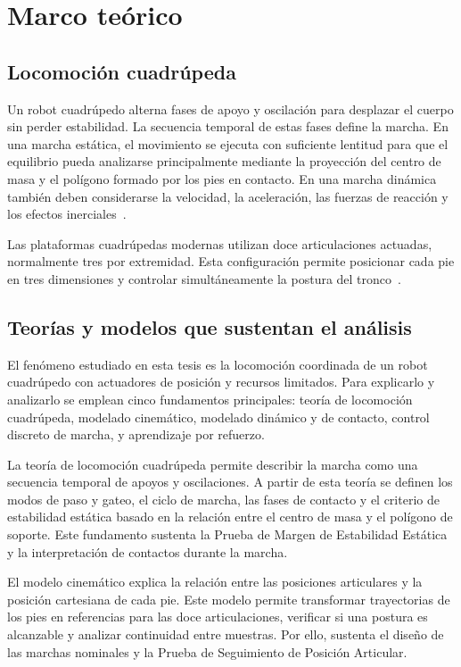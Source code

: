 \chapter{Marco teórico}

\section{Locomoción cuadrúpeda}

Un robot cuadrúpedo alterna fases de apoyo y oscilación para desplazar el cuerpo sin perder estabilidad. La secuencia temporal de estas fases define la marcha. En una marcha estática, el movimiento se ejecuta con suficiente lentitud para que el equilibrio pueda analizarse principalmente mediante la proyección del centro de masa y el polígono formado por los pies en contacto. En una marcha dinámica también deben considerarse la velocidad, la aceleración, las fuerzas de reacción y los efectos inerciales~\cite{zamani2011dynamics}.

Las plataformas cuadrúpedas modernas utilizan doce articulaciones actuadas, normalmente tres por extremidad. Esta configuración permite posicionar cada pie en tres dimensiones y controlar simultáneamente la postura del tronco~\cite{bledt2018cheetah3,hutter2016anymal}.

\section{Teorías y modelos que sustentan el análisis}

El fenómeno estudiado en esta tesis es la locomoción coordinada de un robot
cuadrúpedo con actuadores de posición y recursos limitados. Para explicarlo y
analizarlo se emplean cinco fundamentos principales: teoría de locomoción
cuadrúpeda, modelado cinemático, modelado dinámico y de contacto, control
discreto de marcha, y aprendizaje por refuerzo.

La teoría de locomoción cuadrúpeda permite describir la marcha como una
secuencia temporal de apoyos y oscilaciones. A partir de esta teoría se definen
los modos de paso y gateo, el ciclo de marcha, las fases de contacto y el
criterio de estabilidad estática basado en la relación entre el centro de masa y
el polígono de soporte. Este fundamento sustenta la Prueba de Margen de
Estabilidad Estática y la interpretación de contactos durante la marcha.

El modelo cinemático explica la relación entre las posiciones articulares y la
posición cartesiana de cada pie. Este modelo permite transformar trayectorias de
los pies en referencias para las doce articulaciones, verificar si una postura
es alcanzable y analizar continuidad entre muestras. Por ello, sustenta el
diseño de las marchas nominales y la Prueba de Seguimiento de Posición
Articular.

